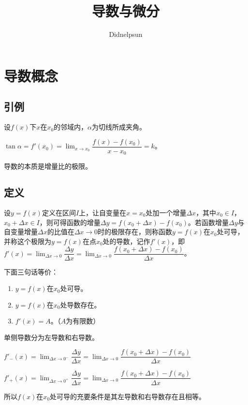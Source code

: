 \documentclass[UTF8, 12pt]{ctexart}
\author{Didnelpsun}
\title{导数与微分}
\date{}
\begin{document}
\renewcommand{\arraystretch}{1.5}
\maketitle
\thispagestyle{empty}
\tableofcontents
\thispagestyle{empty}
\newpage
\pagestyle{plain}
\setcounter{page}{1}
\section{导数概念}
\subsection{引例}

设$f(x)$下$x$在$x_0$的邻域内，$\alpha$为切线所成夹角。

$\tan\alpha=f'(x_0)=\lim_{x\to x_0}\dfrac{f(x)-f(x_0)}{x-x_0}=k$。

导数的本质是增量比的极限。

\subsection{定义}

设$y=f(x)$定义在区间$I$上，让自变量在$x=x_0$处加一个增量$\Delta x$，其中$x_0\in I$，$x_0+\Delta x\in I$，则可得函数的增量$\Delta y=f(x_0+\Delta x)-f(x_0)$。若函数增量$\Delta y$与自变量增量$\Delta x$的比值在$\Delta x\to 0$时的极限存在，则称函数$y=f(x)$在$x_0$处可导，并称这个极限为$y=f(x)$在点$x_0$处的导数，记作$f'(x)$，即$f'(x)=\lim_{\Delta x\to 0}\dfrac{\Delta y}{\Delta x}=\lim_{\Delta x\to 0}\dfrac{f(x_0+\Delta x)-f(x_0)}{\Delta x}$。

下面三句话等价：

\begin{enumerate}
    \item $y=f(x)$在$x_0$处可导。
    \item $y=f(x)$在$x_0$处导数存在。
    \item $f'(x)=A$。（$A$为有限数）
\end{enumerate}

单侧导数分为左导数和右导数。

$f'_-(x)=\lim_{\Delta x\to 0^-}\dfrac{\Delta y}{\Delta x}=\lim_{\Delta x\to 0}\dfrac{f(x_0+\Delta x)-f(x_0)}{\Delta x}$

$f'_+(x)=\lim_{\Delta x\to 0^+}\dfrac{\Delta y}{\Delta x}=\lim_{\Delta x\to 0}\dfrac{f(x_0+\Delta x)-f(x_0)}{\Delta x}$

所以$f(x)$在$x_0$处可导的充要条件是其左导数和右导数存在且相等。
\end{document}
